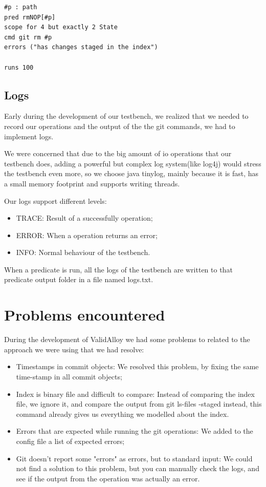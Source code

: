 \begin{lstlisting}[caption=Config file example]
#p : path
pred rmNOP[#p]
scope for 4 but exactly 2 State
cmd git rm #p
errors ("has changes staged in the index")  

runs 100
\end{lstlisting}

\subsection{Logs}

Early during the development of our testbench, we realized that we needed to record our operations and the output of the the git commands, we had to implement logs.


We were concerned that due to the big amount of io operations that our testbench does, adding a powerful but complex log system(like log4j) would stress the testbench even more, so we choose java tinylog, mainly because it is fast, has a small memory footprint and supports writing threads.

Our logs support different levels:
\begin{itemize}
\item TRACE: Result of a successfully operation;
\item ERROR: When a operation returns an error;
\item INFO: Normal behaviour of the testbench.
\end{itemize}
When a predicate is run, all the logs of the testbench are written to that predicate output folder in a file named logs.txt.
\newpage
\section{Problems encountered}

During the development of ValidAlloy we had some problems to related to the approach we were using that we had resolve:
\begin{itemize}
\item Timestamps in commit objects: We resolved this problem, by fixing the same time-stamp in all commit objects;
\item Index is binary file and difficult to compare: Instead of comparing the index file, we ignore it, and compare the output from git ls-files -staged instead, this command already gives us everything we modelled about the index.
\item Errors that are expected while running the git operations: We added to the config file a list of expected errors;
\item Git doesn't report some "errors" as errors, but to standard input: We could not find a solution to this problem, but you can manually check the logs, and see if the output from the operation was actually an error.
\end{itemize}
